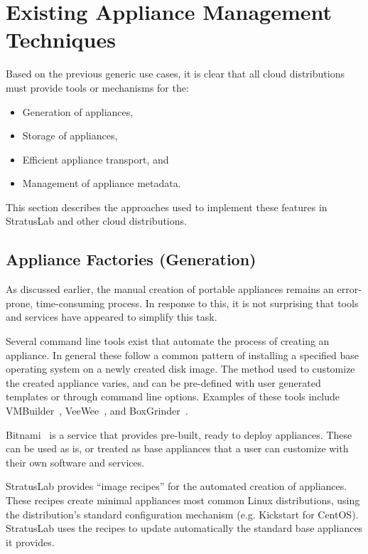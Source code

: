 \section{Existing Appliance Management Techniques}
\label{sec:other-approaches}

Based on the previous generic use cases, it is clear that all cloud
distributions must provide tools or mechanisms for the:
\begin{itemize}
\item Generation of appliances,
\item Storage of appliances,
\item Efficient appliance transport, and
\item Management of appliance metadata.
\end{itemize}
This section describes the approaches used to implement these features
in StratusLab and other cloud distributions.

\subsection{Appliance Factories (Generation)}

As discussed earlier, the manual creation of portable appliances
remains an error-prone, time-consuming process.  In response to this,
it is not surprising that tools and services have appeared to simplify
this task.

Several command line tools exist that automate the process of creating
an appliance. In general these follow a common pattern of installing a
specified base operating system on a newly created disk image. The
method used to customize the created appliance varies, and can be
pre-defined with user generated templates or through command line
options.  Examples of these tools include VMBuilder~\cite{vmbuilder},
VeeWee~\cite{veewee}, and BoxGrinder~\cite{boxgrinder}.

Bitnami~\cite{bitnami} is a service that provides pre-built, ready to
deploy appliances.  These can be used as is, or treated as base
appliances that a user can customize with their own software and
services.

StratusLab provides ``image recipes'' for the automated creation of
appliances.  These recipes create minimal appliances most common Linux
distributions, using the distribution's standard configuration
mechanism (e.g. Kickstart for CentOS).  StratusLab uses the recipes to
update automatically the standard base appliances it provides.

